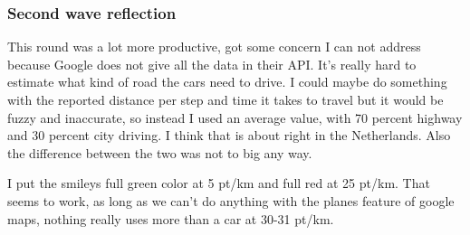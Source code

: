 \documentclass[final,a4paper,11pt]{article}
\begin{document}
\subsubsection*{Second wave reflection}
This round was a lot more productive, got some concern I can not address because Google does not give all the data in their API. It's really hard to estimate what kind of road the cars need to drive. I could maybe do something with the reported distance per step and time it takes to travel but it would be fuzzy and inaccurate, so instead I used an average value, with 70 percent highway and 30 percent city driving. I think that is about right in the Netherlands. Also the difference between the two was not to big any way.

I put the smileys full green color at 5 pt/km and full red at 25 pt/km. That seems to work, as long as we can't do anything with the planes feature of google maps, nothing really uses more than a car at 30-31 pt/km.
\end{document}
